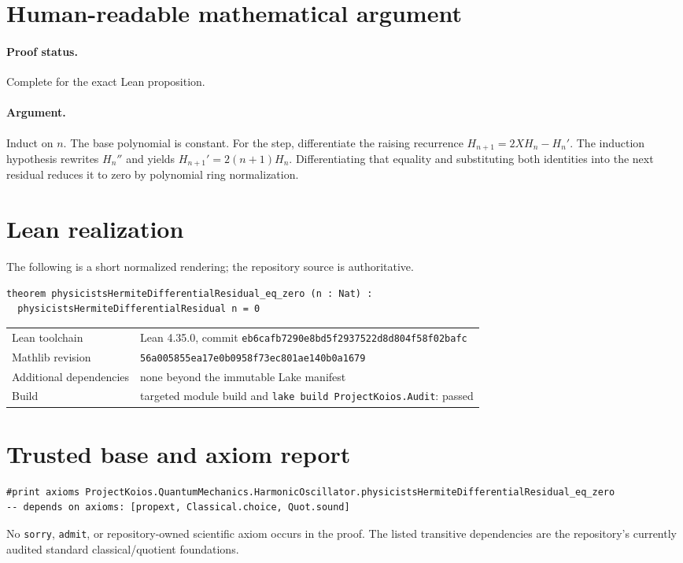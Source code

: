 \documentclass[11pt]{article}
\begin{document}
\section{Human-readable mathematical argument}
\paragraph{Proof status.} Complete for the exact Lean proposition.
\paragraph{Argument.} Induct on $n$.  The base polynomial is constant.  For the step, differentiate the raising recurrence $H_{n+1}=2XH_n-H_n'$.  The induction hypothesis rewrites $H_n''$ and yields $H_{n+1}'=2(n+1)H_n$.  Differentiating that equality and substituting both identities into the next residual reduces it to zero by polynomial ring normalization.

\section{Lean realization}
The following is a short normalized rendering; the repository source is authoritative.
\begin{lstlisting}
theorem physicistsHermiteDifferentialResidual_eq_zero (n : Nat) :
  physicistsHermiteDifferentialResidual n = 0
\end{lstlisting}
\begin{tabularx}{\textwidth}{@{}lY@{}}\toprule
Lean toolchain & Lean 4.35.0, commit \texttt{eb6cafb7290e8bd5f2937522d8d804f58f02bafc} \\
Mathlib revision & \texttt{56a005855ea17e0b0958f73ec801ae140b0a1679} \\
Additional dependencies & none beyond the immutable Lake manifest \\
Build & targeted module build and \texttt{lake build ProjectKoios.Audit}: passed \\
\bottomrule\end{tabularx}

\section{Trusted base and axiom report}
\begin{lstlisting}
#print axioms ProjectKoios.QuantumMechanics.HarmonicOscillator.physicistsHermiteDifferentialResidual_eq_zero
-- depends on axioms: [propext, Classical.choice, Quot.sound]
\end{lstlisting}
No \texttt{sorry}, \texttt{admit}, or repository-owned scientific axiom occurs in the
proof. The listed transitive dependencies are the repository's currently audited standard
classical/quotient foundations.
\end{document}
